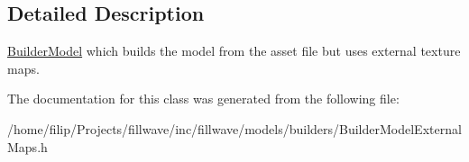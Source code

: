 \subsection{Detailed Description}
\hyperlink{classflw_1_1flf_1_1BuilderModel}{Builder\+Model} which builds the model from the asset file but uses external texture maps. 

The documentation for this class was generated from the following file\+:\begin{DoxyCompactItemize}
\item 
/home/filip/\+Projects/fillwave/inc/fillwave/models/builders/Builder\+Model\+External\+Maps.\+h\end{DoxyCompactItemize}
